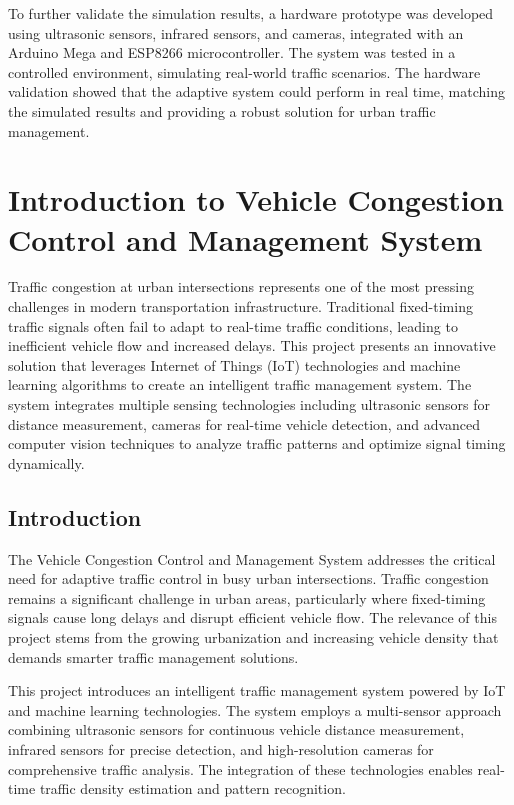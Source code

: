\documentclass[12pt]{report}
\begin{document}
\vspace{0.75em}

\hspace*{1em}To further validate the simulation results, a hardware prototype was developed using ultrasonic sensors, infrared sensors, and cameras, integrated with an Arduino Mega and ESP8266 microcontroller. The system was tested in a controlled environment, simulating real-world traffic scenarios. The hardware validation showed that the adaptive system could perform in real time, matching the simulated results and providing a robust solution for urban traffic management.

\pagebreak




\chapter{Introduction to Vehicle Congestion Control and Management System}
Traffic congestion at urban intersections represents one of the most pressing challenges in modern transportation infrastructure. Traditional fixed-timing traffic signals often fail to adapt to real-time traffic conditions, leading to inefficient vehicle flow and increased delays. This project presents an innovative solution that leverages Internet of Things (IoT) technologies and machine learning algorithms to create an intelligent traffic management system. The system integrates multiple sensing technologies including ultrasonic sensors for distance measurement, cameras for real-time vehicle detection, and advanced computer vision techniques to analyze traffic patterns and optimize signal timing dynamically.

\section[Introduction]{\textbf{Introduction}}

The Vehicle Congestion Control and Management System addresses the critical need for adaptive traffic control in busy urban intersections. Traffic congestion remains a significant challenge in urban areas, particularly where fixed-timing signals cause long delays and disrupt efficient vehicle flow. The relevance of this project stems from the growing urbanization and increasing vehicle density that demands smarter traffic management solutions.

This project introduces an intelligent traffic management system powered by IoT and machine learning technologies. The system employs a multi-sensor approach combining ultrasonic sensors for continuous vehicle distance measurement, infrared sensors for precise detection, and high-resolution cameras for comprehensive traffic analysis. The integration of these technologies enables real-time traffic density estimation and pattern recognition.
\end{document}

